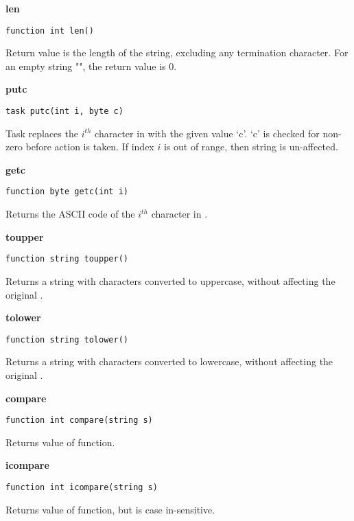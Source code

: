 \begin{description}

\item{{\bf len}}
\begin{Verbatim}[formatcom=\color{blue}, fillcolor=\color{cyan}]
function int len()
\end{Verbatim}
Return value is the length of the string, excluding any termination
character. For an empty string "", the return value is $0$.

\item{{\bf putc}}
\begin{Verbatim}[formatcom=\color{blue}, fillcolor=\color{cyan}]
task putc(int i, byte c)
\end{Verbatim}
Task replaces the $i^{th}$ character in \kwstring with the given
value `c'. `c' is checked for non-zero before action is taken. If
index $i$ is out of range, then string is un-affected.

\item{{\bf getc}}
\begin{Verbatim}[formatcom=\color{blue}, fillcolor=\color{cyan}]
function byte getc(int i)
\end{Verbatim}
Returns the ASCII code of the $i^{th}$ character in \kwstring.

\item{{\bf toupper}}
\begin{Verbatim}[formatcom=\color{blue}, fillcolor=\color{cyan}]
function string toupper()
\end{Verbatim}
Returns a string with characters converted to uppercase, without
affecting the original \kwstring.

\item{{\bf tolower}}
\begin{Verbatim}[formatcom=\color{blue}, fillcolor=\color{cyan}]
function string tolower()
\end{Verbatim}
Returns a string with characters converted to lowercase, without
affecting the original \kwstring.

\item{{\bf compare}}
\begin{Verbatim}[formatcom=\color{blue}, fillcolor=\color{cyan}]
function int compare(string s)
\end{Verbatim}
Returns value of  \lc {} function.

\item{{\bf icompare}}
\begin{Verbatim}[formatcom=\color{blue}, fillcolor=\color{cyan}]
function int icompare(string s)
\end{Verbatim}
Returns value of  \lc {} function, but is case
in-sensitive.


\end{description}
